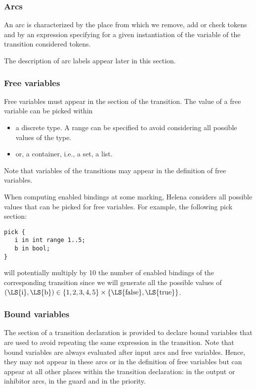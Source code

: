 \transitiondef


\subsubsection{Arcs}
An arc is characterized by the place from which we remove, add or
check tokens and by an expression specifying for a given instantiation
of the variable of the transition considered tokens.

The description of arc labels appear later in this section.\\

\arcdef


\subsubsection{Free variables}
Free variables must appear in the  section of the
transition.  The value of a free variable can be picked within
\begin{itemize}
\item a discrete type.  A range can be specified to avoid considering
  all possible values of the type.
\item or, a container, i.e., a set, a list.
\end{itemize}
Note that variables of the transitions may appear in the definition of
free variables.

When computing enabled bindings at some marking, Helena considers all
possible values that can be picked for free variables.  For example,
the following pick section:
\begin{lstlisting}
pick {
   i in int range 1..5;
   b in bool;
}
\end{lstlisting}
will potentially multiply by 10 the number of enabled bindings of the
corresponding transition since we will generate all the possible
values of $(\text{\LS{i}},\text{\LS{b}}) \in
\{ 1, 2, 3, 4, 5 \} \times \{ \text{\LS{false}}, \text{\LS{true}} \}$.\\

\freevariablesdef


\subsubsection{Bound variables}
The  section of a transition declaration is provided to
declare bound variables that are used to avoid repeating the same
expression in the transition.  Note that bound variables are always
evaluated after input arcs and free variables.  Hence, they may not
appear in these arcs or in the definition of free variables but can
appear at all other places within the transition declaration: in the
output or inhibitor arcs, in the guard and in the priority.

